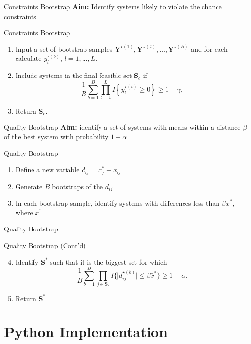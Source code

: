 \documentclass[aspectratio=169]{beamer}
\begin{document}
\begin{frame}{Constraints Bootstrap}
\textbf{Aim:} Identify systems likely to violate the chance constraints
\begin{block}{Constraints Bootstrap}
\begin{enumerate}
    \item Input a set of bootstrap samples $\mathbf{Y}^{\star (1)}, \mathbf{Y}^{\star (2)}, \ldots, \mathbf{Y}^{\star (B)}$ and for each  calculate $y^{\star (b)}_{l}$, $l=1, \ldots, L$.
    \item Include systems in the final feasible set $\mathbf{S}_{c}$ if 
\[
\frac{1}{B} \sum_{b=1}^{B} \prod_{l=1}^{L} I \left\{ y^{\star (b)}_{l} \geq 0\right\} \geq 1-\gamma,
\]
\item Return $\mathbf{S}_{c}$.
\end{enumerate}
\end{block}
\end{frame}
\begin{frame}{Quality Bootstrap}
\textbf{Aim:} identify a set of systems with means within a distance $\beta$ of the best system with probability $1-\alpha$
\begin{block}{Quality Bootstrap}
\begin{enumerate}
\item Define a new variable $d_{ij} = x_{j}^{*}-x_{ij}$
\item Generate $B$ bootstraps of the $d_{ij}$
\item In each bootstrap sample, identify systems with differences less than $\beta \bar{x}^{*}$, where $\bar{x}^{*}$

\end{enumerate}
\end{block}
\end{frame}
\begin{frame}{Quality Bootstrap}
\begin{block}{Quality Bootstrap (Cont'd)}
\begin{enumerate}\setcounter{enumi}{3}
\item Identify $\mathbf{S}^{*}$ such that it is the biggest set for which
\[
\frac{1}{B} \sum_{b=1}^{B} \prod_{j \in \mathbf{S}_{c}} I\{\vert d^{\star (b)}_{ij} \vert \leq \beta \bar{x}^{*}\} \geq 1 - \alpha.
\]
\item Return $\mathbf{S}^{*}$
\end{enumerate}
\end{block}
\end{frame}
\section{Python Implementation}
\end{document}
